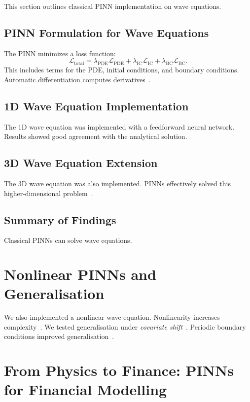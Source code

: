 \documentclass[12pt,a4paper]{article}
\begin{document}
This section outlines classical PINN implementation on wave equations.

\subsection{PINN Formulation for Wave Equations}

The PINN minimizes a loss function:
\[
\mathcal{L}_{\text{total}} = \lambda_{\text{PDE}} \mathcal{L}_{\text{PDE}} + \lambda_{\text{IC}} \mathcal{L}_{\text{IC}} + \lambda_{\text{BC}} \mathcal{L}_{\text{BC}}.
\]
This includes terms for the PDE, initial conditions, and boundary conditions. Automatic differentiation computes derivatives~\cite{baydin2018automatic}.

\subsection{1D Wave Equation Implementation}

The 1D wave equation was implemented with a feedforward neural network. Results showed good agreement with the analytical solution.

\subsection{3D Wave Equation Extension}

The 3D wave equation was also implemented. PINNs effectively solved this higher-dimensional problem~\cite{cuomo2022scientific, alkhadhr2023wave}.

\subsection{Summary of Findings}

Classical PINNs can solve wave equations.

\section{Nonlinear PINNs and Generalisation}

We also implemented a nonlinear wave equation. Nonlinearity increases complexity~\cite{wang2022understanding}. We tested generalisation under \textit{covariate shift}~\cite{quinonero2009dataset}. Periodic boundary conditions improved generalisation~\cite{karniadakis2021physics}.

\section{From Physics to Finance: PINNs for Financial Modelling}
\end{document}

